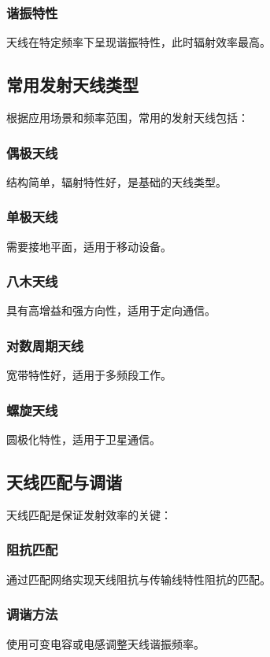 \documentclass[12pt,UTF8]{ctexbook}
\begin{document}
\subsubsection{谐振特性}
天线在特定频率下呈现谐振特性，此时辐射效率最高。

\subsection{常用发射天线类型}

根据应用场景和频率范围，常用的发射天线包括：

\subsubsection{偶极天线}
结构简单，辐射特性好，是基础的天线类型。

\subsubsection{单极天线}
需要接地平面，适用于移动设备。

\subsubsection{八木天线}
具有高增益和强方向性，适用于定向通信。

\subsubsection{对数周期天线}
宽带特性好，适用于多频段工作。

\subsubsection{螺旋天线}
圆极化特性，适用于卫星通信。

\subsection{天线匹配与调谐}

天线匹配是保证发射效率的关键：

\subsubsection{阻抗匹配}
通过匹配网络实现天线阻抗与传输线特性阻抗的匹配。

\subsubsection{调谐方法}
使用可变电容或电感调整天线谐振频率。
\end{document}
